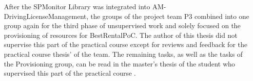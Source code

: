 After the SPMonitor Library was integrated into AM-DrivingLicenseManagement,
the groups of the project team P3 combined into one group again for the third phase of unsupervised work
and solely focused on the provisioning of resources for BestRentalPoC.
The author of this thesis did not supervise this part of the practical
course except for reviews and feedback for the practical course thesis' of the team. The remaining
tasks, as well as the tasks of the Provisioning group, can be read in the master's thesis of the student
who supervised this part of the practical course \cite{Go23}.